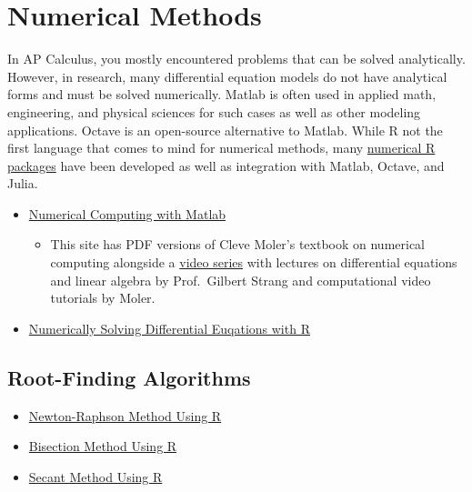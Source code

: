 \documentclass[]{book}
\providecommand{\tightlist}{%
  \setlength{\itemsep}{0pt}\setlength{\parskip}{0pt}}
\begin{document}
\hypertarget{numerical-methods}{%
\section{Numerical Methods}\label{numerical-methods}}

In AP Calculus, you mostly encountered problems that can be solved analytically. However, in research, many differential equation models do not have analytical forms and must be solved numerically. Matlab is often used in applied math, engineering, and physical sciences for such cases as well as other modeling applications. Octave is an open-source alternative to Matlab. While R not the first language that comes to mind for numerical methods, many \href{https://cran.r-project.org/web/views/NumericalMathematics.html}{numerical R packages} have been developed as well as integration with Matlab, Octave, and Julia.

\begin{itemize}
\tightlist
\item
  \href{https://www.mathworks.com/moler/chapters.html}{Numerical Computing with Matlab}

  \begin{itemize}
  \tightlist
  \item
    This site has PDF versions of Cleve Moler's textbook on numerical computing alongside a \href{https://www.mathworks.com/academia/courseware/learn-differential-equations.html}{video series} with lectures on differential equations and linear algebra by Prof.~Gilbert Strang and computational video tutorials by Moler.
  \end{itemize}
\item
  \href{http://rstudio-pubs-static.s3.amazonaws.com/32888_197d1a1896534397b67fb04e0d4899ae.html}{Numerically Solving Differential Euqations with R}
\end{itemize}

\hypertarget{root-finding-algorithms}{%
\subsection{Root-Finding Algorithms}\label{root-finding-algorithms}}

\begin{itemize}
\tightlist
\item
  \href{https://rpubs.com/aaronsc32/newton-raphson-method}{Newton-Raphson Method Using R}
\item
  \href{https://rpubs.com/aaronsc32/bisection-method-r}{Bisection Method Using R}
\item
  \href{https://rpubs.com/aaronsc32/secant-method-r}{Secant Method Using R}
\end{itemize}
\end{document}
